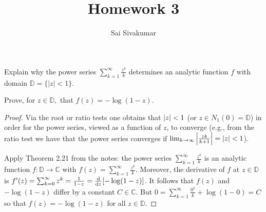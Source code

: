 \documentclass[12pt]{amsart}
\title{Homework 3}
\author{Sai Sivakumar}
\newcommand{\DD}{\mathbb{D}}
\begin{document}
\maketitle

\thispagestyle{empty}
 
 Explain why  the power series $\sum_{k=1}^\infty \frac{z^k}{k}$ 
 determines an analytic function $f$ with domain $\DD=\{|z|<1\}.$



 Prove, for $z\in \DD,$ that $f(z)=-\log(1-z).$
\bigskip

\begin{proof}
\baselineskip=24pt
Via the root or ratio tests one obtains that $\abs{z}< 1$ (or $z\in N_1(0) = \mathbb{D}$) in order for the power series, viewed as a function of $z$, to converge (e.g., from the ratio test we have that the power series converges if $\lim_{k\to\infty}\abs{\frac{zk}{k+1}} = \abs{z} < 1$).

Apply Theorem 2.21 from the notes: the power series $\sum_{k=1}^\infty \frac{z^k}{k}$ is an analytic function $f\colon\mathbb{D}\to\mathbb{C}$ with $f(z) = \sum_{k=1}^\infty \frac{z^k}{k}$. Moreover, the derivative of $f$ at $z\in\mathbb{D}$ is $f^\prime(z) = \sum_{k=0}^\infty z^k = \frac{1}{1-z} = \dv{z}[-\log(1-z)]$. It follows that $f(z)$ and $-\log(1-z)$ differ by a constant $C\in \mathbb{C}$. But $0 = \sum_{k=1}^\infty \frac{0^k}{k}+\log(1-0) = C$ so that $f(z) = -\log(1-z)$ for all $z\in\mathbb{D}$.
\end{proof}
\end{document}
